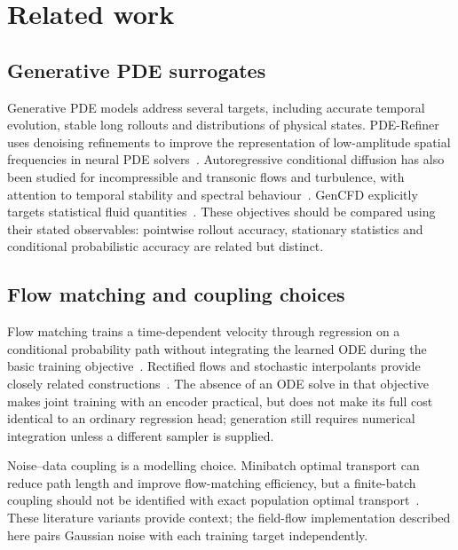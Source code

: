 \section{Related work}
\label{sec:related}

\subsection{Generative PDE surrogates}
\label{sec:related:diffusion}

Generative PDE models address several targets, including accurate temporal
evolution, stable long rollouts and distributions of physical states.
PDE-Refiner uses denoising refinements to improve the representation of
low-amplitude spatial frequencies in neural PDE solvers~\cite{lippe2023pderefiner}.
Autoregressive conditional diffusion has also been studied for incompressible
and transonic flows and turbulence, with attention to temporal stability and
spectral behaviour~\cite{kohl2026acdm}. GenCFD explicitly targets statistical
fluid quantities~\cite{molinaro2024gencfd}. These objectives should be compared
using their stated observables: pointwise rollout accuracy, stationary
statistics and conditional probabilistic accuracy are related but distinct.

\subsection{Flow matching and coupling choices}
\label{sec:related:fm}

Flow matching trains a time-dependent velocity through regression on a
conditional probability path without integrating the learned ODE during the
basic training objective~\cite{lipman2023flowmatching}. Rectified flows and
stochastic interpolants provide closely related
constructions~\cite{liu2023rectifiedflow,albergo2023buildingflows,
albergo2023interpolants}. The absence of an ODE solve in that objective makes
joint training with an encoder practical, but does not make its full cost
identical to an ordinary regression head; generation still requires numerical
integration unless a different sampler is supplied.

Noise--data coupling is a modelling choice. Minibatch optimal transport can
reduce path length and improve flow-matching efficiency, but a finite-batch
coupling should not be identified with exact population optimal
transport~\cite{tong2024otcfm,pooladian2023multisample}. These literature
variants provide context; the field-flow implementation described here pairs
Gaussian noise with each training target independently.

